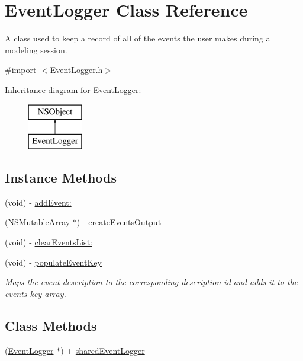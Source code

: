 \hypertarget{interface_event_logger}{\section{Event\-Logger Class Reference}
\label{interface_event_logger}
}


A class used to keep a record of all of the events the user makes during a modeling session.  




{\ttfamily \#import $<$Event\-Logger.\-h$>$}

Inheritance diagram for Event\-Logger\-:\begin{figure}[H]
\begin{center}
\leavevmode
\includegraphics[height=2.000000cm]{interface_event_logger}
\end{center}
\end{figure}
\subsection*{Instance Methods}
\begin{DoxyCompactItemize}
\item 
(void) -\/ \hyperlink{interface_event_logger_aa085061d6f02d4b8b40c8b347c676f9f}{add\-Event\-:}
\item 
(N\-S\-Mutable\-Array $\ast$) -\/ \hyperlink{interface_event_logger_ac66e3dc819bc1cf129a2141875b440a3}{create\-Events\-Output}
\item 
(void) -\/ \hyperlink{interface_event_logger_a0ad12aea4a582b9d7393847f90718307}{clear\-Events\-List\-:}
\item 
\hypertarget{interface_event_logger_a60120e85b3b04e0212654fd51bc1a679}{(void) -\/ \hyperlink{interface_event_logger_a60120e85b3b04e0212654fd51bc1a679}{populate\-Event\-Key}}\label{interface_event_logger_a60120e85b3b04e0212654fd51bc1a679}

\begin{DoxyCompactList}\small\item\em Maps the event description to the corresponding description id and adds it to the events key array. \end{DoxyCompactList}\end{DoxyCompactItemize}
\subsection*{Class Methods}
\begin{DoxyCompactItemize}
\item 
(\hyperlink{interface_event_logger}{Event\-Logger} $\ast$) + \hyperlink{interface_event_logger_a6343b40276111dd1d7275bbde3a3e508}{shared\-Event\-Logger}
\end{DoxyCompactItemize}
